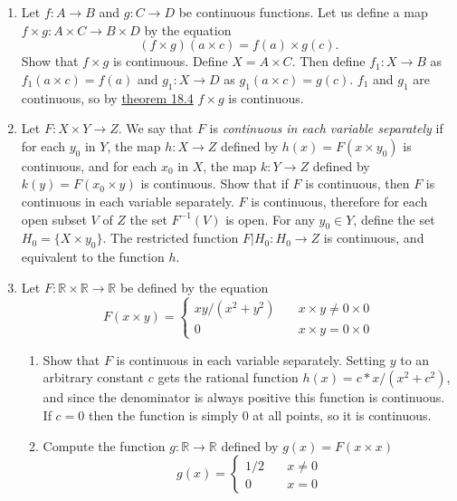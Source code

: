\documentclass[12pt,letterpaper]{article}
\begin{document}
\begin{enumerate}
\begin{enumerate}
  \end{enumerate}
  \item Let $f: A \rightarrow B$ and $g: C \rightarrow D$ be continuous functions. Let us define a map $f\times g: A\times C \rightarrow B\times D$ by the equation $$(f\times g)(a\times c) = f(a) \times g(c).$$ Show that $f\times g$ is continuous.\hspace{5in}\n
  \indent Define $X = A\times C$. Then define $f_1: X\rightarrow B$ as $f_1(a \times c) = f(a)$ and $g_1: X\rightarrow D$ as $g_1(a \times c) = g(c)$.
  $f_1$ and $g_1$ are continuous, so by \hyperref[thm:MapsProducts18.4]{theorem 18.4} $f\times g$ is continuous.
  \item Let $F:X\times Y \rightarrow Z$. We say that $F$ is \emph{continuous in each variable separately} if for each $y_0$ in $Y$, the map $h: X\rightarrow Z$ defined by $h(x)=F(x\times y_0)$ is continuous, and for each $x_0$ in $X$, the map $k:Y\rightarrow Z$ defined by $k(y) = F(x_0 \times y)$ is continuous. Show that if $F$ is continuous, then $F$ is continuous in each variable separately. \hspace{5in} \n
  \indent $F$ is continuous, therefore for each open subset $V$ of $Z$ the set $F^{-1}(V)$ is open. For any $y_0\in Y$, define the set $H_0 = \{X\times y_0\}$. The restricted function $F|H_0: H_0 \rightarrow Z$ is continuous, and equivalent to the function $h$.
  \item Let $F: \mathbb{R} \times \mathbb{R} \rightarrow \mathbb{R}$ be defined by the equation
    $$F(x\times y) = \begin{cases}
      xy/(x^2+y^2) & \quad x\times y \neq 0\times 0 \\
      0            & \quad x\times y = 0\times 0
    \end{cases}$$
    \begin{enumerate}
      \item Show that $F$ is continuous in each variable separately. \hspace{5in} \n
      \indent Setting $y$ to an arbitrary constant $c$ gets the rational function $h(x) = c*x/(x^2+c^2)$, and since the denominator is always positive this function is continuous. If $c=0$ then the function is simply $0$ at all points, so it is continuous. 
      \item Compute the function $g: \mathbb{R} \rightarrow \mathbb{R}$ defined by $g(x) = F(x\times x)$\hspace{5in}\n
      $$g(x) = \begin{cases} 1/2 & \quad x\neq 0 \\ 0 & \quad x=0 \end{cases}$$

\end{enumerate}
\end{enumerate}
\end{document}
